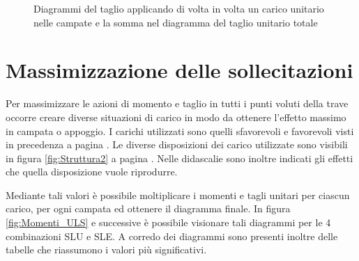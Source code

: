\begin{figure}[htbp]
\caption{Diagrammi del taglio applicando di volta in volta un carico unitario nelle campate e la somma nel diagramma del taglio unitario totale}
\label{fig:TagliUnitari}
\end{figure}
\section{Massimizzazione delle sollecitazioni}
Per massimizzare le azioni di momento e taglio in tutti i punti voluti della trave occorre creare diverse situazioni di carico in modo da ottenere l'effetto massimo in campata o appoggio.
I carichi utilizzati sono quelli sfavorevoli e favorevoli visti in precedenza a pagina \pageref{cap:combinazioniCarico}.
Le diverse  disposizioni dei carico utilizzate sono visibili in figura \ref{fig:Struttura2} a pagina \pageref{fig:Struttura2}.
Nelle didascalie sono inoltre indicati gli effetti che quella disposizione vuole riprodurre.


Mediante tali valori è possibile moltiplicare i momenti e tagli unitari per ciascun carico, per ogni campata ed ottenere il diagramma finale.
In figura \ref{fig:Momenti_ULS} e successive è possibile visionare tali diagrammi per le 4 combinazioni SLU e SLE. 
A corredo dei diagrammi sono presenti inoltre delle tabelle che riassumono i valori più significativi.

